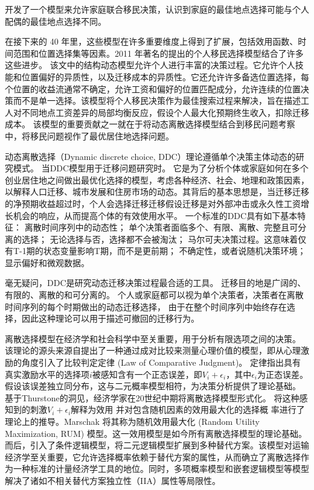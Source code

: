 \documentclass[a4paper,12pt,oneside, fontset=mac]{ctexbook} %
\begin{document}
\cite{mincerFamilyMigrationDecisions1978} 开发了一个模型来允许家庭联合移民决策，认识到家庭的最佳地点选择可能与个人配偶的最佳地点选择不同。

在接下来的 40 年里，这些模型在许多重要维度上得到了扩展，包括效用函数、时间范围和位置选择集等因素。2011 年著名的\cite{kennanEffectExpectedIncome2011}提出的个人移民选择模型结合了许多这些进步。
该文中的结构动态模型允许个人进行丰富的决策过程。它允许个人技能和位置偏好的异质性，以及迁移成本的异质性。它还允许许多备选位置选择，每个位置的收益流通常不确定，允许工资和偏好的位置匹配成分，允许连续的位置决策而不是单一选择。该模型将个人移民决策作为最佳搜索过程来解决，旨在描述工人对不同地点工资差异的局部均衡反应，假设个人最大化预期终生收入，扣除迁移成本。
该模型的重要贡献之一就在于将动态离散选择模型结合到移民问题考察中，将移民问题视作了最优居住地选择问题。

动态离散选择（Dynamic discrete choice, DDC）理论遵循单个决策主体动态的研究模式。
当DDC模型用于迁移问题研究时。
它是为了分析个体或家庭如何在多个创业居住地之间做出最优化选择的模型，考虑各种经济、社会、地理和政策因素，以解释人口迁移、城市发展和住房市场的动态。其背后的基本思想是，当迁移迁移的净预期收益超过时，个人会选择迁移迁移假设迁移是对外部冲击或永久性工资增长机会的响应，从而提高个体的有效使用水平。
一个标准的DDC具有如下基本特征：
离散时间序列中的动态性；
单个决策者面临多个、有限、离散、完整且可分离的选择；
无论选择与否，选择都不会被淘汰；
马尔可夫决策过程。这意味着仅有T-1期的状态变量影响T期，而不是更前期；
不确定性，或者说随机决策环境；
显示偏好和微观数据。

毫无疑问，DDC是研究动态迁移决策过程最合适的工具。
迁移目的地是广阔的、有限的、离散的和可分离的。
个人或家庭都可以视为单个决策者，决策者在离散时间序列的每个时期做出的动态迁移选择，
由于在整个时间序列中始终存在选择，因此这种理论可以用于描述可撤回的迁移行为。

离散选择模型在经济学和社会科学中至关重要，用于分析有限选项之间的决策。
该理论的源头来源自\cite{thurstoneLawComparativeJudgment1927}提出了一种通过成对比较来测量心理价值的模型，即从心理激励的角度引入了比较判定定律 (Law of Comparative Judgment)。
定律指出具有真实激励水平的选择项$i$被感知含有一个正态误差，即$V_i+\epsilon_i$，其中\(\epsilon_i\)为正态误差。假设该误差独立同分布，这与二元概率模型相符，为决策分析提供了理论基础。
基于Thurstone的洞见，经济学家在20世纪中期将离散选择模型形式化。
\cite{marschakBinarychoiceConstraintsRandom1960}将这种感知到的刺激$V_i+\epsilon_i$解释为效用 并对包含随机因素的效用最大化的选择概 率进行了理论上的推导。Marschak 将其称为随机效用最大化 (Random Utility Maximization, RUM) 模型。这一效用模型是如今所有离散选择模型的理论基础。
而后，\cite{mcfaddenConditionalLogitAnalysis1973}引入了条件逻辑模型，将二元逻辑模型扩展到多种替代方案。该模型对运输经济学至关重要，它允许选择概率依赖于替代方案的属性，从而确立了离散选择作为一种标准的计量经济学工具的地位。同时，多项概率模型和嵌套逻辑模型等模型解决了诸如不相关替代方案独立性（IIA）属性等局限性。
\end{document}
